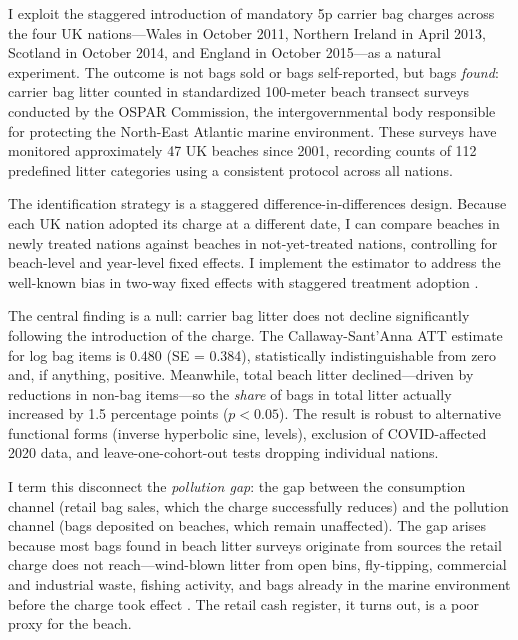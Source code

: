 \documentclass[12pt]{article}
\begin{document}
I exploit the staggered introduction of mandatory 5p carrier bag charges across the four UK nations---Wales in October 2011, Northern Ireland in April 2013, Scotland in October 2014, and England in October 2015---as a natural experiment. The outcome is not bags sold or bags self-reported, but bags \textit{found}: carrier bag litter counted in standardized 100-meter beach transect surveys conducted by the OSPAR Commission, the intergovernmental body responsible for protecting the North-East Atlantic marine environment. These surveys have monitored approximately 47 UK beaches since 2001, recording counts of 112 predefined litter categories using a consistent protocol across all nations.

The identification strategy is a staggered difference-in-differences design. Because each UK nation adopted its charge at a different date, I can compare beaches in newly treated nations against beaches in not-yet-treated nations, controlling for beach-level and year-level fixed effects. I implement the \citet{callaway_difference--differences_2021} estimator to address the well-known bias in two-way fixed effects with staggered treatment adoption \citep{goodman-bacon_difference--differences_2021, sun_estimating_2021}.

The central finding is a null: carrier bag litter does not decline significantly following the introduction of the charge. The Callaway-Sant'Anna ATT estimate for log bag items is 0.480 (SE = 0.384), statistically indistinguishable from zero and, if anything, positive. Meanwhile, total beach litter declined---driven by reductions in non-bag items---so the \textit{share} of bags in total litter actually increased by 1.5 percentage points ($p < 0.05$). The result is robust to alternative functional forms (inverse hyperbolic sine, levels), exclusion of COVID-affected 2020 data, and leave-one-cohort-out tests dropping individual nations.

I term this disconnect the \textit{pollution gap}: the gap between the consumption channel (retail bag sales, which the charge successfully reduces) and the pollution channel (bags deposited on beaches, which remain unaffected). The gap arises because most bags found in beach litter surveys originate from sources the retail charge does not reach---wind-blown litter from open bins, fly-tipping, commercial and industrial waste, fishing activity, and bags already in the marine environment before the charge took effect \citep{ospar_commission_beach_2020}. The retail cash register, it turns out, is a poor proxy for the beach.
\end{document}
